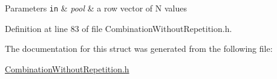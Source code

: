\begin{DoxyParams}[1]{Parameters}
\mbox{\tt in}  & {\em pool} & a row vector of N values\\
\hline
\end{DoxyParams}


Definition at line 83 of file Combination\+Without\+Repetition.\+h.



The documentation for this struct was generated from the following file\+:\begin{DoxyCompactItemize}
\item 
\hyperlink{_combination_without_repetition_8h}{Combination\+Without\+Repetition.\+h}\end{DoxyCompactItemize}
